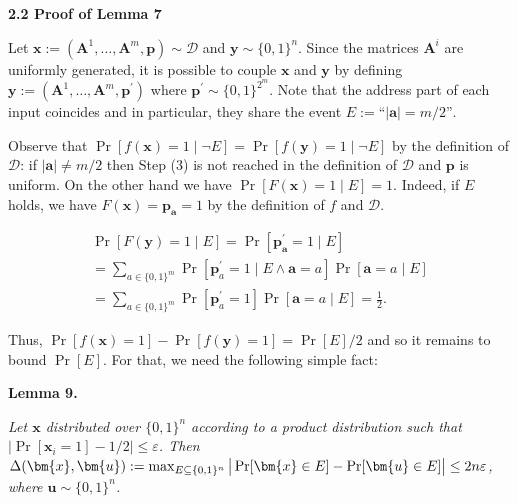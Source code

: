 \documentclass[10pt,a4paper]{article}
\begin{document}
\par\medskip\noindent\textbf{
2.2 Proof of Lemma 7
}\par




Let $\bm{x}:=(\bm{A}^{1},\dots,\bm{A}^{m},\bm{p})\sim\mathcal{D}$ and $\bm{y}\sim\{0,1\}^{n}$. Since the matrices $\bm{A}^{i}$ are uniformly generated, it is possible to couple $\bm{x}$ and $\bm{y}$ by defining $\bm{y}:=(\bm{A}^{1},\dots,\bm{A}^{m},\bm{p}^{\prime})$ where $\bm{p}^{\prime}\sim\{0,1\}^{2^{m}}$. Note that the address part of each input coincides and in particular, they share the event $E:=\text{``$|\bm{a}|=m/2$''}$.\par




Observe that $\Pr[f(\bm{x})=1\mid\lnot E]=\Pr[f(\bm{y})=1\mid\lnot E]$ by the definition of $\mathcal{D}$: if $|\bm{a}|\neq m/2$ then Step (3) is not reached in the definition of $\mathcal{D}$ and $\bm{p}$ is uniform. On the other hand we have $\Pr[F(\bm{x})=1\mid E]=1$. Indeed, if $E$ holds, we have $F(\bm{x})=\bm{p}_{\bm{a}}=1$ by the definition of $f$ and $\mathcal{D}$.\par


\[\begin{gathered}
\displaystyle\Pr[F(\bm{y})=1\mid E] \displaystyle=\Pr[\bm{p}^{\prime}_{\bm{a}}=1\mid E] \\
\displaystyle=\sum_{a\in\{0,1\}^{m}}\Pr[\bm{p}^{\prime}_{a}=1\mid E\land\bm{a}=a]\Pr[\bm{a}=a\mid E] \\
\displaystyle=\sum_{a\in\{0,1\}^{m}}\Pr[\bm{p}^{\prime}_{a}=1]\Pr[\bm{a}=a\mid
E]=\frac{1}{2}.
\end{gathered}\]


Thus, $\Pr[f(\bm{x})=1]-\Pr[f(\bm{y})=1]=\Pr[E]/2$ and so it remains to bound $\Pr[E]$. For that, we need the following simple fact:\par





\par\medskip\noindent\textbf{
\textbf{Lemma 9}\textbf{.}
}\par



\emph{Let $\bm{x}$ distributed over $\{0,1\}^{n}$ according to a product distribution such that
$|\Pr[\bm{x}_{i}=1]-1/2|\leq\varepsilon$. Then $\Delta(\bm{x},\bm{u}):=\max_{E\subseteq\{0,1\}^{n}}\big{|}\Pr[\bm{x}\in E]-\Pr[\bm{u}\in E]\big{|}\leq 2n\varepsilon$, where $\bm{u}\sim\{0,1\}^{n}$.}\par
\end{document}
